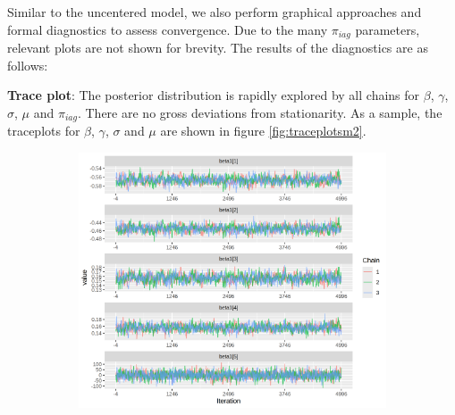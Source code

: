\documentclass[12pt]{article}
\begin{document}

Similar to the uncentered model, we also perform graphical approaches and formal diagnostics to assess convergence.  Due to the many $\pi_{iag}$ parameters, relevant plots are not shown for brevity. The results of the diagnostics are as follows:

\textbf{Trace plot}: The posterior distribution is rapidly explored by all chains for $\beta$, $\gamma$, $\sigma$, $\mu$ and $\pi_{iag}$. There are no gross deviations from stationarity. As a sample, the traceplots for $\beta$, $\gamma$, $\sigma$ and $\mu$ are shown in figure \ref{fig:traceplotsm2}.

\begin{figure}[h!]
    \centering
    \begin{subfigure}{0.45\textwidth}
        \includegraphics[width=\linewidth]{pictures/mod2/mod2trace_beta.png}
    \end{subfigure}
    \begin{subfigure}{0.45\textwidth}

\end{subfigure}
\end{figure}
\end{document}
